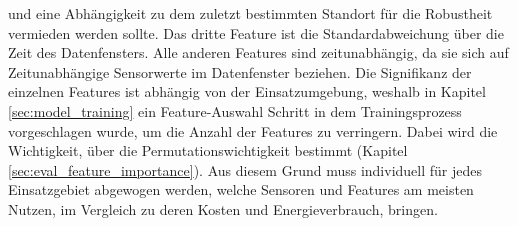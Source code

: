 und eine Abhängigkeit zu dem zuletzt bestimmten Standort für die Robustheit vermieden werden sollte.
\newpage
Das dritte Feature ist die Standardabweichung über die Zeit des Datenfensters.
Alle anderen Features sind zeitunabhängig, da sie sich auf Zeitunabhängige Sensorwerte im Datenfenster beziehen.
\newline
\newline
Die Signifikanz der einzelnen Features ist abhängig von der Einsatzumgebung, weshalb in Kapitel \ref{sec:model_training}
ein Feature-Auswahl Schritt in dem Trainingsprozess vorgeschlagen wurde, um die Anzahl der Features zu verringern.
Dabei wird die Wichtigkeit, über die Permutationswichtigkeit bestimmt (Kapitel \ref{sec:eval_feature_importance}).
Aus diesem Grund muss individuell für jedes Einsatzgebiet abgewogen werden, welche Sensoren und Features am meisten Nutzen,
im Vergleich zu deren Kosten und Energieverbrauch, bringen.
